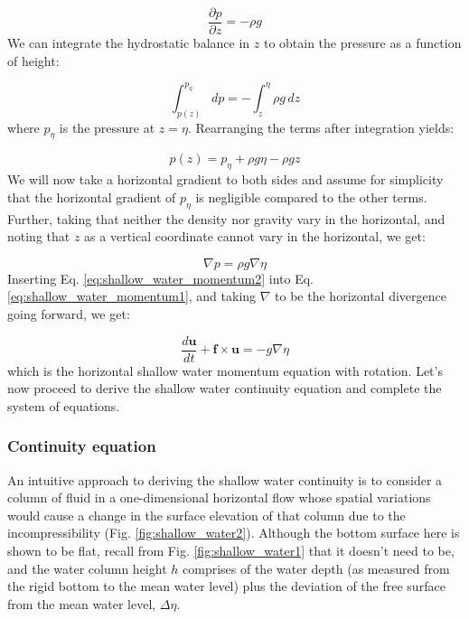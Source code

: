 \documentclass[12pt]{article}
\numberwithin{equation}{section}
\numberwithin{figure}{section}
\numberwithin{table}{section}
\begin{document}
\begin{equation}
  \frac{\partial p}{\partial z} = -\rho g
\end{equation}
We can integrate the hydrostatic balance in $z$ to obtain the pressure as a
function of height:

\begin{equation}
  \int_{p(z)}^{p_\eta} dp = - \int_z^\eta \rho g \, dz
\end{equation}
where $p_\eta$ is the pressure at $z = \eta$.
Rearranging the terms after integration yields:

\begin{equation}
  p(z) = p_\eta + \rho g \eta - \rho g z
\end{equation}
We will now take a horizontal gradient to both sides and assume for simplicity
that the horizontal gradient of $p_\eta$ is negligible compared to the other
terms.
Further, taking that neither the density nor gravity vary in the horizontal,
and noting that $z$ as a vertical coordinate cannot vary in the horizontal,
we get:

\begin{equation}
  \nabla p = \rho g \nabla \eta
  \label{eq:shallow_water_momentum2}
\end{equation}
Inserting Eq. \ref{eq:shallow_water_momentum2} into
Eq. \ref{eq:shallow_water_momentum1}, and taking $\nabla$ to be the horizontal
divergence going forward, we get:

\begin{equation}
  \frac{d \mathbf{u}}{dt} + \mathbf{f} \times \mathbf{u} =
  - g \nabla \eta
  \label{eq:shallow_water_momentum3}
\end{equation}
which is the horizontal shallow water momentum equation with rotation.
Let's now proceed to derive the shallow water continuity equation and complete
the system of equations.

\subsubsection{Continuity equation}

An intuitive approach to deriving the shallow water continuity is to consider
a column of fluid in a one-dimensional horizontal flow whose spatial variations
would cause a change in the surface elevation of that column due to the
incompressibility (Fig. \ref{fig:shallow_water2}).
Although the bottom surface here is shown to be flat, recall from Fig.
\ref{fig:shallow_water1} that it doesn't need to be, and the water column height
$h$ comprises of the water depth (as measured from the rigid bottom to the mean
water level) plus the deviation of the free surface from the mean water level,
$\Delta \eta$.
\end{document}
